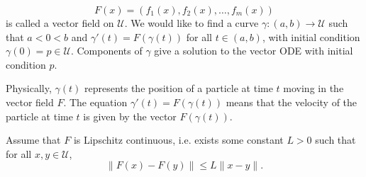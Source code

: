 \[
F(x) = (f_1(x), f_2(x), \ldots, f_m(x))
\]
is called a vector field on $\mathcal U$. We would like to find a curve $\gamma: (a, b) \to \mathcal U$ such that $a < 0 < b$ and $\gamma'(t) = F(\gamma(t))$ for all $t \in (a, b)$, with initial condition $\gamma(0) = p \in \mathcal U$. Components of $\gamma$ give a solution to the vector ODE with initial condition $p$.

Physically, $\gamma(t)$ represents the position of a particle at time $t$ moving in the vector field $F$. The equation $\gamma'(t) = F(\gamma(t))$ means that the velocity of the particle at time $t$ is given by the vector $F(\gamma(t))$.

Assume that $F$ is Lipschitz continuous, i.e. exists some constant $L > 0$ such that for all $x, y \in \mathcal U$,
\[
\|F(x) - F(y)\| \leq L \|x - y\|.
\]

